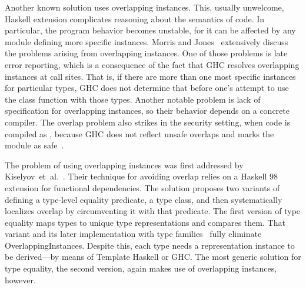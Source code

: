 \documentclass[sigplan,screen,review,anonymous]{acmart}
\begin{document}
Another known solution uses overlapping instances. This, usually unwelcome, Haskell extension complicates reasoning about the semantics of code. In particular, the program behavior becomes unstable, for it can be affected by any module defining more specific instances. Morris and Jones~\cite{Morris2010} extensively discuss the problems arising from overlapping instances. One of those problems is late error reporting, which is a consequence of the fact that GHC resolves overlapping instances at call sites. That is, if there are more than one most specific instances for particular types, GHC does not determine that before one's attempt to use the class function with those types. Another notable problem is lack of specification for overlapping instances, so their behavior depends on a concrete compiler. 
The overlap problem also strikes in the security setting, when code is compiled as , because GHC does not reflect unsafe overlaps and marks the module as safe~\cite{sh-overlapping}.

The problem of using overlapping instances was first addressed by Kiselyov~et~al.~\cite{Kiselyov2004}. Their technique for avoiding overlap relies on a Haskell 98 extension for functional dependencies. The solution proposes two variants of defining a type-level equality predicate, a type class, and then systematically localizes overlap by circumventing it with that predicate. The first version of type equality maps types to unique type representations and compares them. That variant and its later implementation with type families~\cite{Kiselyov2012} fully eliminate \textsf{OverlappingInstances}. Despite this, each type needs a representation instance to be derived---by means of Template Haskell or GHC. The most generic solution for type equality, the second version, again makes use of overlapping instances, however.
\end{document}
